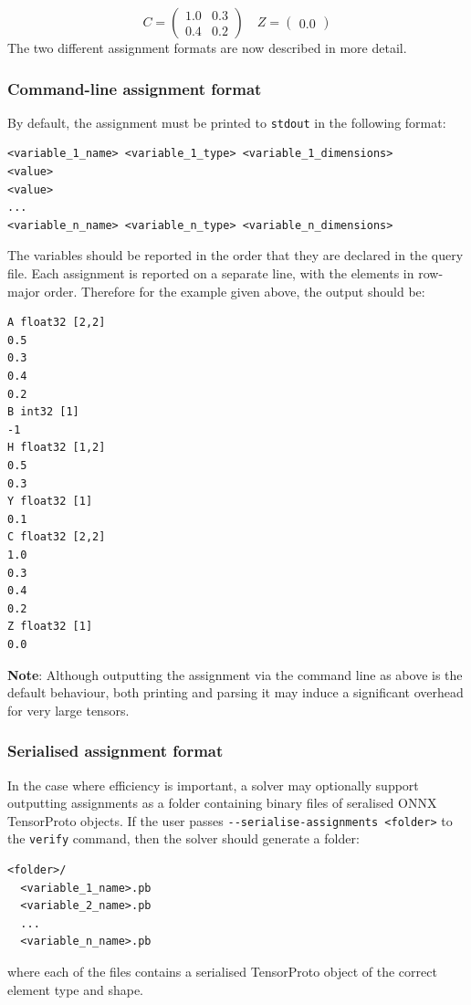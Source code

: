 \begin{equation*}
C = \begin{pmatrix}
1.0 & 0.3 \\
0.4 & 0.2
\end{pmatrix}
\quad
Z = \begin{pmatrix}
0.0
\end{pmatrix}
\end{equation*}
The two different assignment formats are now described in more detail.

\subsubsection{Command-line assignment format}

By default, the assignment must be printed to \texttt{stdout} in the following format:
\begin{lstlisting}[style=bash]
<variable_1_name> <variable_1_type> <variable_1_dimensions>
<value>
<value>
...
<variable_n_name> <variable_n_type> <variable_n_dimensions>
\end{lstlisting}
The variables should be reported in the order that they are declared in the query file. Each assignment is reported on a separate line, with the elements in row-major order. 
Therefore for the example given above, the output should be:
\begin{lstlisting}[style=bash]
A float32 [2,2]
0.5
0.3
0.4
0.2
B int32 [1]
-1
H float32 [1,2]
0.5
0.3
Y float32 [1]
0.1
C float32 [2,2]
1.0
0.3
0.4
0.2
Z float32 [1]
0.0
\end{lstlisting}

\textbf{Note}: Although outputting the assignment via the command line as above is the default behaviour, both printing and parsing it may induce a significant overhead for very large tensors. 

\subsubsection{Serialised assignment format}
\label{sec:seralised-assignment-format}

In the case where efficiency is important, a solver may optionally support outputting assignments as a folder containing binary files of seralised ONNX TensorProto objects. If the user passes \texttt{{-}-serialise-assignments <folder>} to the \texttt{verify} command, then the solver should generate a folder:
\begin{lstlisting}[style=bash]
<folder>/
  <variable_1_name>.pb
  <variable_2_name>.pb
  ...
  <variable_n_name>.pb
\end{lstlisting}
where each of the files contains a serialised TensorProto object of the correct element type and shape.

